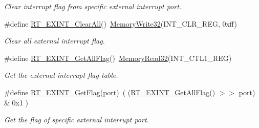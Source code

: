 \begin{DoxyCompactItemize}
\begin{DoxyCompactList}\small\item\em Clear interrupt flag from specific external interrupt port. \end{DoxyCompactList}\item 
\#define \mbox{\hyperlink{a00011_a4f2cc857d9a0da5f06bbf5ff62babbdb}{R\+T\+\_\+\+E\+X\+I\+N\+T\+\_\+\+Clear\+All}}()~\mbox{\hyperlink{a00020_a6b9732365b12e48ddb89fe1028b975b0}{Memory\+Write32}}(I\+N\+T\+\_\+\+C\+L\+R\+\_\+\+R\+EG, 0xff)
\begin{DoxyCompactList}\small\item\em Clear all external interrupt flag. \end{DoxyCompactList}\item 
\#define \mbox{\hyperlink{a00011_ab8287fc872a2d0ae785c8b3b51a37a5e}{R\+T\+\_\+\+E\+X\+I\+N\+T\+\_\+\+Get\+All\+Flag}}()~\mbox{\hyperlink{a00020_a2d484dc15bdf30ee11ab3b05f31f0e16}{Memory\+Read32}}(I\+N\+T\+\_\+\+C\+T\+L1\+\_\+\+R\+EG)
\begin{DoxyCompactList}\small\item\em Get the external interrupt flag table. \end{DoxyCompactList}\item 
\#define \mbox{\hyperlink{a00011_ae65409aaf69a9f495207ebbe133f161d}{R\+T\+\_\+\+E\+X\+I\+N\+T\+\_\+\+Get\+Flag}}(port)~( (\mbox{\hyperlink{a00011_ab8287fc872a2d0ae785c8b3b51a37a5e}{R\+T\+\_\+\+E\+X\+I\+N\+T\+\_\+\+Get\+All\+Flag}}() $>$$>$ port) \& 0x1 )
\begin{DoxyCompactList}\small\item\em Get the flag of specific external interrupt port. \end{DoxyCompactList}\end{DoxyCompactItemize}
